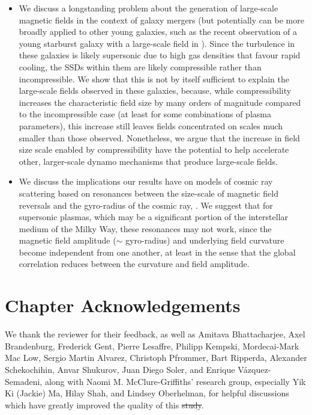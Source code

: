 \documentclass[12pt,twoside]{extreport}
\makeatletter
\providecommand{\DIFaddtex}[1]{{\protect\color{DIFgreen}\uwave{#1}}} %
\providecommand{\DIFdeltex}[1]{{\protect\color{DIFpurple}\sout{#1}}} %
\providecommand{\DIFaddbegin}{} %
\providecommand{\DIFaddend}{} %
\providecommand{\DIFdelbegin}{} %
\providecommand{\DIFdelend}{} %
\providecommand{\DIFadd}[1]{\texorpdfstring{\DIFaddtex{#1}}{#1}} %
\providecommand{\DIFdel}[1]{\texorpdfstring{\DIFdeltex{#1}}{}} %
\providecommand{\DIFscaledelfig}{0.5}
\newlength{\DIFdelgraphicswidth} %
\newlength{\DIFdelgraphicsheight} %
\providecommand{\DIFaddincludegraphics}[2][]{{\color{DIFgreen}\fbox{\DIFOincludegraphics[#1]{#2}}}} %
\providecommand{\DIFdelincludegraphics}[2][]{%
\sbox{\DIFdelgraphicsbox}{\DIFOincludegraphics[#1]{#2}}%
\settoboxwidth{\DIFdelgraphicswidth}{\DIFdelgraphicsbox} %
\settoboxtotalheight{\DIFdelgraphicsheight}{\DIFdelgraphicsbox} %
\scalebox{\DIFscaledelfig}{%
\parbox[b]{\DIFdelgraphicswidth}{\usebox{\DIFdelgraphicsbox}\\[-\baselineskip] \rule{\DIFdelgraphicswidth}{0em}}\llap{\resizebox{\DIFdelgraphicswidth}{\DIFdelgraphicsheight}{%
\setlength{\unitlength}{\DIFdelgraphicswidth}%
\begin{picture}(1,1)%
\thicklines\linethickness{2pt} %
{\color{DIFpurple}\put(0,0){\framebox(1,1){}}}%
{\color{DIFpurple}\put(0,0){\line( 1,1){1}}}%
{\color{DIFpurple}\put(0,1){\line(1,-1){1}}}%
\end{picture}%
}\hspace*{3pt}}} %
} %
\DeclareRobustCommand{\DIFaddbegin}{\DIFOaddbegin \let\includegraphics\DIFaddincludegraphics} %
\DeclareRobustCommand{\DIFaddend}{\DIFOaddend \let\includegraphics\DIFOincludegraphics} %
\DeclareRobustCommand{\DIFdelbegin}{\DIFOdelbegin \let\includegraphics\DIFdelincludegraphics} %
\DeclareRobustCommand{\DIFdelend}{\DIFOaddend \let\includegraphics\DIFOincludegraphics} %
\let\sout@orig\sout %
\renewcommand{\sout}[1]{\ifmmode\text{\sout@orig{\ensuremath{#1}}}\else\sout@orig{#1}\fi} %
\makeatother
\begin{document}
\begin{itemize}
    \item We discuss a longstanding problem about the generation of large-scale magnetic fields in the context of galaxy mergers (but potentially can be more broadly applied to other young galaxies, such as the recent observation of a young starburst galaxy with a large-scale field in \citealt{geach2023polarized}). Since the turbulence in these galaxies is likely supersonic due to high gas densities that favour rapid cooling, the SSDs within them are likely compressible rather than incompressible. We show that this is not by itself sufficient to explain the large-scale fields observed in these galaxies, because, while compressibility increases the characteristic field size by many orders of magnitude compared to the incompressible case (at least for some combinations of plasma parameters), this increase still leaves fields concentrated on scales much smaller than those observed. Nonetheless, we argue that the increase in field size scale enabled by compressibility have the potential to help accelerate other, larger-scale dynamo mechanisms that produce large-scale fields. \\

    \item We discuss the implications our results have on models of cosmic ray scattering based on resonances between the size-scale of magnetic field reversals and the gyro-radius of the cosmic ray, \citep[e.g.,][]{kempski2023cosmic}. We suggest that for supersonic plasmas, which may be a significant portion of the interstellar medium of the Milky Way, these resonances may not work, since the magnetic field amplitude ($\sim$ gyro-radius) and underlying field curvature become independent from one another, at least in the sense that the global correlation reduces between the curvature and field amplitude.
\end{itemize}

\section*{Chapter Acknowledgements}
We thank the reviewer for their feedback, as well as Amitava Bhattacharjee, Axel Brandenburg, Frederick Gent, Pierre Lesaffre, Philipp Kempski, Mordecai-Mark Mac Low, Sergio Martin Alvarez, Christoph Pfrommer, Bart Ripperda, Alexander Schekochihin, Anvar Shukurov, Juan Diego Soler, and Enrique V\'azquez-Semadeni, along with Naomi M. McClure-Griffiths' research group, especially Yik Ki (Jackie) Ma, Hilay Shah, and Lindsey Oberhelman, for helpful discussions which have greatly improved the quality of this \DIFdelbegin \DIFdel{study}\DIFdelend \DIFaddbegin \DIFadd{chapter}\DIFaddend .
\end{document}
